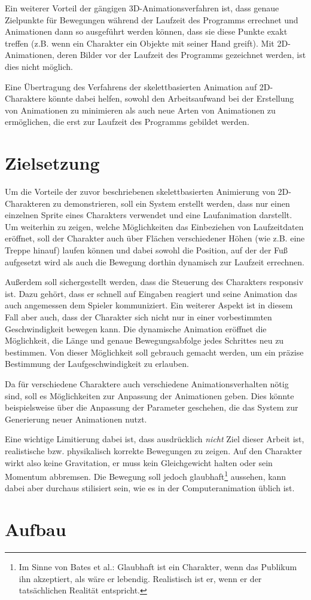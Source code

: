 Ein weiterer Vorteil der gängigen 3D-Animationsverfahren ist, dass genaue Zielpunkte für Bewegungen während der Laufzeit des Programms errechnet und Animationen dann so ausgeführt werden können, dass sie diese Punkte exakt treffen (z.B. wenn ein Charakter ein Objekte mit seiner Hand greift). Mit 2D-Animationen, deren Bilder vor der Laufzeit des Programms gezeichnet werden, ist dies nicht möglich.

Eine Übertragung des Verfahrens der skelettbasierten Animation auf 2D-Charaktere könnte dabei helfen, sowohl den Arbeitsaufwand bei der Erstellung von Animationen zu minimieren als auch neue Arten von Animationen zu ermöglichen, die erst zur Laufzeit des Programms gebildet werden.

\section{Zielsetzung}
Um die Vorteile der zuvor beschriebenen skelettbasierten Animierung von 2D-Charakteren zu demonstrieren, soll ein System erstellt werden, dass nur einen einzelnen Sprite eines Charakters verwendet und eine Laufanimation darstellt. Um weiterhin zu zeigen, welche Möglichkeiten das Einbeziehen von Laufzeitdaten eröffnet, soll der Charakter auch über Flächen verschiedener Höhen (wie z.B. eine Treppe hinauf) laufen können und dabei sowohl die Position, auf der der Fuß aufgesetzt wird als auch die Bewegung dorthin dynamisch zur Laufzeit errechnen.

Außerdem soll sichergestellt werden, dass die Steuerung des Charakters responsiv ist. Dazu gehört, dass er schnell auf Eingaben reagiert und seine Animation das auch angemessen dem Spieler kommuniziert. Ein weiterer Aspekt ist in diesem Fall aber auch, dass der Charakter sich nicht nur in einer vorbestimmten Geschwindigkeit bewegen kann. Die dynamische Animation eröffnet die Möglichkeit, die Länge und genaue Bewegungsabfolge jedes Schrittes neu zu bestimmen. Von dieser Möglichkeit soll gebrauch gemacht werden, um ein präzise Bestimmung der Laufgeschwindigkeit zu erlauben.

Da für verschiedene Charaktere auch verschiedene Animationsverhalten nötig sind, soll es Möglichkeiten zur Anpassung der Animationen geben. Dies könnte beispielsweise über die Anpassung der Parameter geschehen, die das System zur Generierung neuer Animationen nutzt.

Eine wichtige Limitierung dabei ist, dass ausdrücklich \textit{nicht} Ziel dieser Arbeit ist, realistische bzw. physikalisch korrekte Bewegungen zu zeigen. Auf den Charakter wirkt also keine Gravitation, er muss kein Gleichgewicht halten oder sein Momentum abbremsen. Die Bewegung soll jedoch glaubhaft\footnote{Im Sinne von Bates et al.\cite{bates1994role}: Glaubhaft ist ein Charakter, wenn das Publikum ihn akzeptiert, als wäre er lebendig. Realistisch ist er, wenn er der tatsächlichen Realität entspricht.} aussehen, kann dabei aber durchaus stilisiert sein, wie es in der Computeranimation üblich ist.

\section{Aufbau}
